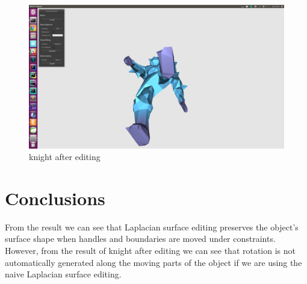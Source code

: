 \documentclass[twocolumn, a4paper]{article}
\begin{document}
\begin{figure}[H]
	\centering
	\includegraphics[width=1.0\linewidth]{knight_after3.png}
	\caption{knight after editing}
\end{figure}

\section{Conclusions}
From the result we can see that Laplacian surface editing preserves the object's surface shape when handles and boundaries are moved under constraints. However, from the result of knight after editing we can see that rotation is not automatically generated along the moving parts of the object if we are using the naive Laplacian surface editing.
\end{document}
